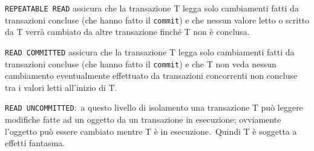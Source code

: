 \texttt{REPEATABLE READ} assicura che la transazione T legga solo cambiamenti fatti da transazioni concluse (che hanno fatto il \texttt{commit}) e che nessun valore letto o scritto da T verrà cambiato da altre transazione finché T non è conclusa.\

\texttt{READ COMMITTED} assicura che la transazione T legga solo cambiamenti fatti da transazioni concluse (che hanno fatto il \texttt{commit}) e che T non veda nessun cambiamento eventualmente effettuato da transazioni concorrenti non concluse tra i valori letti all'inizio di T.\

\texttt{READ UNCOMMITTED}:\ a questo livello di isolamento una transazione T può leggere modifiche fatte ad un oggetto da un transazione in esecuzione; ovviamente l'oggetto può essere cambiato mentre T è in esecuzione.\
Quindi T è soggetta a effetti fantasma.
